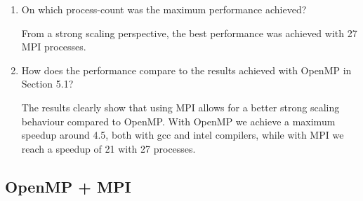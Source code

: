 \documentclass{article}
\begin{document}
\begin{enumerate}
	\item On which process-count was the maximum performance achieved?

	From a strong scaling perspective, the best performance was achieved with 27 MPI processes.

	\item How does the performance compare to the results achieved with OpenMP in Section 5.1?

	The results clearly show that using MPI allows for a better strong scaling behaviour compared to OpenMP. With OpenMP we achieve a maximum speedup around 4.5, both with gcc and intel compilers, while with MPI we reach a speedup of 21 with 27 processes.
\end{enumerate}

\subsection{OpenMP + MPI}
\end{document}
